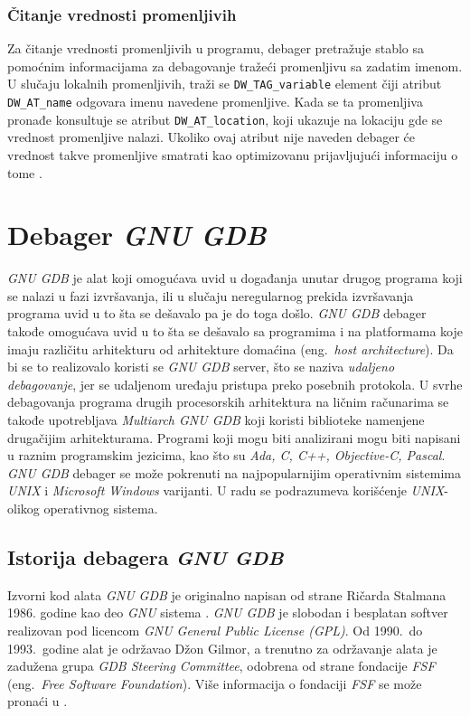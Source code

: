 \documentclass[12pt,oneside]{memoir}
\begin{document}
\subsection{Čitanje vrednosti promenljivih}

Za čitanje vrednosti promenljivih u programu, debager pretražuje stablo sa pomoćnim informacijama za debagovanje tražeći promenljivu sa zadatim imenom. U slučaju lokalnih promenljivih, traži se \texttt{DW\_TAG\_variable} element čiji atribut \texttt{DW\_AT\_name} odgovara imenu navedene promenljive. Kada se ta promenljiva pronađe konsultuje se atribut \texttt{DW\_AT\_location}, koji ukazuje na lokaciju gde se vrednost promenljive nalazi. Ukoliko ovaj atribut nije naveden debager će vrednost takve promenljive smatrati kao optimizovanu prijavljujući informaciju o tome \cite{GDB}.

\chapter{Debager \emph{GNU GDB}}
\label{chp:GDB}

\emph{GNU GDB} je alat koji omogućava uvid u događanja unutar drugog programa koji se nalazi u fazi izvršavanja, ili u slučaju neregularnog prekida izvršavanja programa uvid u to šta se dešavalo pa je do toga došlo. \emph{GNU GDB} debager takođe omogućava uvid u to šta se dešavalo sa programima i na platformama koje imaju različitu arhitekturu od arhitekture domaćina (eng.~\emph{host architecture}). Da bi se to realizovalo koristi se \emph{GNU GDB} server, što se naziva \emph{udaljeno debagovanje}, jer se udaljenom uređaju pristupa preko posebnih protokola. U svrhe debagovanja programa drugih procesorskih arhitektura na ličnim računarima se takođe upotrebljava \emph{Multiarch GNU GDB} koji koristi biblioteke namenjene drugačijim arhitekturama. Programi koji mogu biti analizirani mogu biti napisani u raznim programskim jezicima, kao što su \emph{Ada, C, C++, Objective-C, Pascal}. \emph{GNU GDB} debager se može pokrenuti na najpopularnijim operativnim sistemima \emph{UNIX} i \emph{Microsoft Windows} varijanti. U radu se podrazumeva korišćenje \emph{UNIX}-olikog operativnog sistema.

\section{Istorija debagera \emph{GNU GDB}}

Izvorni kod alata \emph{GNU GDB} je originalno napisan od strane Ričarda Stalmana 1986. godine kao deo \emph{GNU} sistema \cite{GDBDOC}. \emph{GNU GDB} je slobodan i besplatan softver realizovan pod licencom \emph{GNU General Public License (GPL)}. Od 1990.~do 1993.~godine alat je održavao Džon Gilmor, a trenutno za održavanje alata je zadužena grupa \emph{GDB Steering Committee}, odobrena od strane fondacije \emph{FSF} (eng.~\emph{Free Software Foundation}). Više informacija o fondaciji \emph{FSF} se može pronaći u \cite{FSF}.
\end{document}

